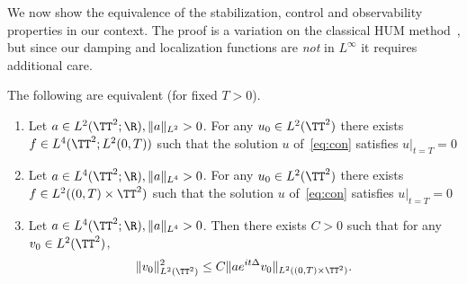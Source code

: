 We now show the equivalence of the stabilization, control and observability properties in our context. The proof is a variation on the classical HUM method~\cite{Li}, but since our damping and localization functions are \emph{not} in $L^\infty$ it requires additional care.
\begin{prop}\label{p:hum}
The following are equivalent (for fixed $T>0$).
\begin{enumerate}
\item \label{i}
Let $a \in L^2(\TT^2;\R), \| a \|_{L^2} >0$. For any $u_0\in L^2(\TT^2)$ there exists $f \in\linebreak L^4(\TT^2 ; L^2(0,T))$ such that the solution $u$ of~\eqref{eq:con} satisfies $u|_{t=T} =0$
\item \label{ii}
Let $a \in L^4(\TT^2;\R), \| a \|_{L^4} >0$. For any $u_0\in L^2(\TT^2)$ there exists $f \in\linebreak L^2((0,T)\times \TT^2)$ such that the solution $u$ of~\eqref{eq:con} satisfies $u |_{t=T} =0$
\item \label{iii}
Let $a \in L^4(\TT^2;\R), \| a \|_{L^4} >0$. Then there exists $C>0$ such that for any $v_0 \in L^2(\TT^2)$,
\begin{equation}\label{observation}
\| v_0 \|_{L^2(\TT^2)}^2 \leq C \| a e^{it \Delta} v_0 \| _{L^2((0,T) \times \TT^2)}.
\end{equation}
\end{enumerate}
\end{prop}

